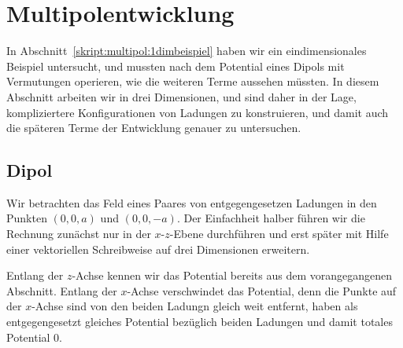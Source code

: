 %
%
%
\section{Multipolentwicklung}
In Abschnitt~\ref{skript:multipol:1dimbeispiel} haben wir ein
eindimensionales Beispiel untersucht, und mussten nach dem Potential
eines Dipols mit Vermutungen operieren, wie die weiteren Terme aussehen
müssten.
In diesem Abschnitt arbeiten wir in drei Dimensionen, und sind daher
in der Lage, kompliziertere Konfigurationen von Ladungen zu
konstruieren, und damit auch die späteren Terme der Entwicklung
genauer zu untersuchen.


\subsection{Dipol}
Wir betrachten das Feld eines Paares von entgegengesetzen Ladungen
in den Punkten $(0,0,a)$ und $(0,0,-a)$.
Der Einfachheit halber führen wir die Rechnung zunächst nur
in der $x$-$z$-Ebene durchführen und erst später mit Hilfe einer
vektoriellen Schreibweise auf drei Dimensionen erweitern.

Entlang der $z$-Achse kennen wir das Potential bereits aus
dem vorangegangenen Abschnitt.
Entlang der $x$-Achse verschwindet das Potential, denn die Punkte
auf der $x$-Achse sind von den beiden Ladungn gleich weit entfernt,
haben als entgegengesetzt gleiches Potential bezüglich beiden Ladungen
und damit totales Potential 0.

